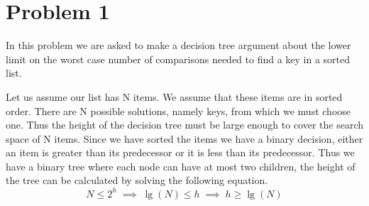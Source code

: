\section*{Problem 1}

In this problem we are asked to make a decision tree argument about the
lower limit on the worst case number of comparisons needed to find a
key in a sorted list.

Let us assume our list has N items. We assume that these items are in
sorted order. There are N possible solutions, namely keys, from which 
we must choose one. Thus the height of the decision tree must be large
enough to cover the search space of N items. Since we have sorted the 
items we have a binary decision, either an item is greater than its 
predecessor or it is less than its predecessor. Thus we have a binary 
tree where each node can have at most two children, the height of the 
tree can be calculated by solving the following equation.
$$
    N \leq 2^h \; \implies \; 
    \lg (N) \leq h \; \implies \; 
    h \geq \lg (N)
$$


